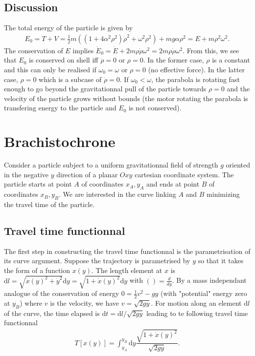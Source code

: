\documentclass[12pt, a4paper]{article}
\begin{document}
\subsection{Discussion}
The total energy of the particle is given by 
\begin{align*}
E_0 = T + V = \frac{1}{2}m \left(\left(1 + 4\alpha^2 \rho^2\right) \dot{\rho}^2  + \omega^2\rho^2 \right) + mg \alpha \rho^2 = E + m\rho^2\omega^2.
\end{align*}
The conservation of $E$ implies $\dot{E}_0 = \dot{E} + 2 m \rho \dot{\rho} \omega^2 = 2 m \rho \dot{\rho} \omega^2$. From this, we see that $E_0$ is conserved on shell iff $\dot{\rho} = 0$ or $\rho = 0$. In the former case, $\rho$ is a constant and this can only be realised if $\omega_0=\omega$ or $\rho = 0$ (no effective force). In the latter case, $\rho = 0$ which is a subcase of $\dot{\rho}=0$. If $\omega_0<\omega$, the parabola is rotating fast enough to go beyond the gravitationnal pull of the particle towards $\rho=0$ and the velocity of the particle grows without bounds (the motor rotating the parabola is transfering energy to the particle and $E_0$ is not conserved). 
\pagebreak

\section{Brachistochrone}
Consider a particle subject to a uniform gravitationnal field of strength $g$ oriented in the negative $y$ direction of a planar $Oxy$ cartesian coordinate system. The particle starts at point $A$ of coordinates $x_A, y_A$ and ends at point $B$ of coordinates $x_B, y_B$. We are interested in the curve linking $A$ and $B$ minimizing the travel time of the particle. 
%
\subsection{Travel time functionnal}
The first step in constructing the travel time functionnal is the parametrisation of its curve argument.  Suppose the trajectory is parametrised by $y$ so that it takes the form of a function $x(y)$. The length element at $x$ is $\text{d} l = \sqrt{\dot{x}(y)^2 + \dot{y}^2} \text{d} y = \sqrt{1 + \dot{x}(y)^2} \text{d} y$ with $\dot{()} = \frac{d}{dy}$. By a mass independant analogue of the conservation of energy $0 = \frac{1}{2} v^2-g y$ (with "potential" energy zero at $y_B$) where $v$ is the velocity, we have $v = \sqrt{2gy}$. For motion along an element $\text{d}l$ of the curve, the time elapsed is $\text{d}t = \text{d}l/\sqrt{2gy}$ leading to te following travel time functionnal 
\begin{align*}
    T[x(y)] = \int_{y_A}^{y_B} \text{d} y \dfrac{\sqrt{1 + \dot{x}(y)^2}}{\sqrt{2gy}}. 
\end{align*}
\end{document}
